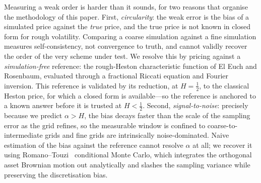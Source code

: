 \documentclass{ws-ijtaf}
\begin{document}
Measuring a weak order is harder than it sounds, for two reasons that organise the
methodology of this paper. First, \emph{circularity}: the weak error is the bias of
a simulated price against the \emph{true} price, and the true price is not known in
closed form for rough volatility. Comparing a coarse simulation against a fine
simulation measures self-consistency, not convergence to truth, and cannot validly
recover the order of the very scheme under test. We resolve this by pricing against
a \emph{simulation-free} reference: the rough-Heston characteristic function of El
Euch and Rosenbaum, evaluated through a fractional Riccati equation and Fourier
inversion. This reference is validated by its reduction, at $H=\tfrac12$, to the
classical Heston price, for which a closed form is available---so the reference is
anchored to a known answer before it is trusted at $H<\tfrac12$. Second,
\emph{signal-to-noise}: precisely because we predict $\alpha > H$, the bias decays
faster than the scale of the sampling error as the grid refines, so the measurable
window is confined to coarse-to-intermediate grids and fine grids are intrinsically
noise-dominated. Naive estimation of the bias against the reference cannot resolve
$\alpha$ at all; we recover it using Romano--Touzi~\citeyearpar{rt1997} conditional Monte Carlo, which
integrates the orthogonal asset Brownian motion out analytically and slashes the
sampling variance while preserving the discretisation bias.
\end{document}
